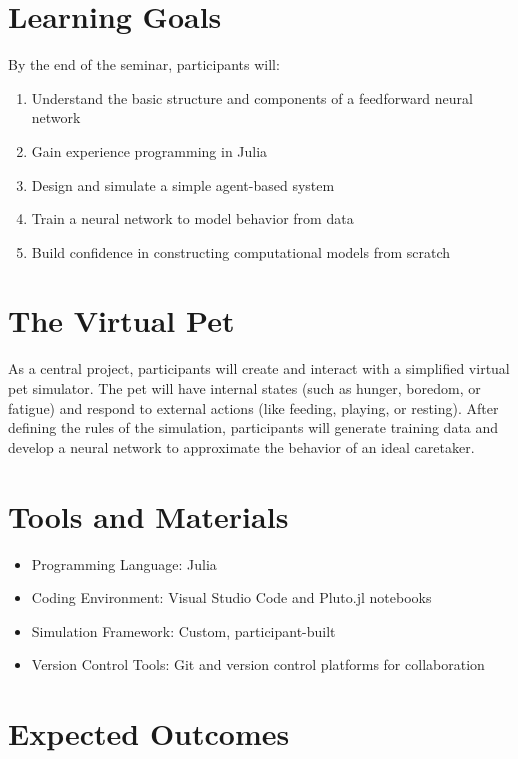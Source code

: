 \documentclass[10pt]{book}
\begin{document}
\section{Learning Goals}

By the end of the seminar, participants will:
\begin{enumerate}[label=\arabic*.]
    \item Understand the basic structure and components of a feedforward neural network
    \item Gain experience programming in Julia
    \item Design and simulate a simple agent-based system
    \item Train a neural network to model behavior from data
    \item Build confidence in constructing computational models from scratch
\end{enumerate}

\section{The Virtual Pet}

As a central project, participants will create and interact with a simplified virtual pet simulator. The pet will have internal states (such as hunger, boredom, or fatigue) and respond to external actions (like feeding, playing, or resting). After defining the rules of the simulation, participants will generate training data and develop a neural network to approximate the behavior of an ideal caretaker.

\section{Tools and Materials}

\begin{itemize}[itemsep=1ex]
    \item Programming Language: Julia
    \item Coding Environment: Visual Studio Code and Pluto.jl notebooks
    \item Simulation Framework: Custom, participant-built
    \item Version Control Tools: Git and version control platforms for collaboration
\end{itemize}



\section{Expected Outcomes}
\end{document}
